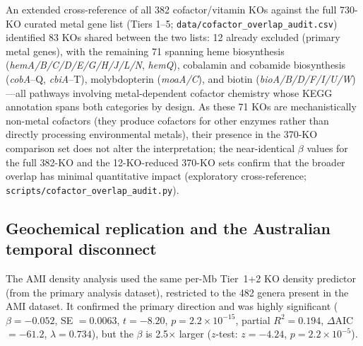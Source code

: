 \documentclass[times]{zHenriquesLab-StyleBioRxiv}
\begin{document}
An extended cross-reference of all 382 cofactor/vitamin KOs against the full
730-KO curated metal gene list (Tiers 1--5; \texttt{data/cofactor\_overlap\_audit.csv})
identified 83 KOs shared between the two lists: 12 already excluded (primary
metal genes), with the remaining 71 spanning heme biosynthesis
(\textit{hemA/B/C/D/E/G/H/J/L/N}, \textit{hemQ}), cobalamin and cobamide
biosynthesis (\textit{cobA}--Q, \textit{cbiA}--T), molybdopterin
(\textit{moaA/C}), and biotin (\textit{bioA/B/D/F/I/U/W})---all pathways
involving metal-dependent cofactor chemistry whose KEGG annotation spans both
categories by design. As these 71 KOs are mechanistically non-metal cofactors
(they produce cofactors for other enzymes rather than directly processing
environmental metals), their presence in the 370-KO comparison set does not
alter the interpretation; the near-identical $\beta$ values for the full
382-KO and the 12-KO-reduced 370-KO sets confirm that the broader overlap has
minimal quantitative impact (exploratory cross-reference;
\texttt{scripts/cofactor\_overlap\_audit.py}).


\subsection{Geochemical replication and the Australian temporal disconnect}
\label{ss:georeplication}

The AMI density analysis used the same per-Mb Tier~1+2 KO
density predictor (from the primary analysis dataset),
restricted to the 482 genera present in the AMI dataset. It
confirmed the primary direction and was highly significant ($\beta = -0.052$,
SE $= 0.0063$, $t = -8.20$, $p = 2.2 \times 10^{-15}$, partial $R^2 = 0.194$,
$\Delta$AIC $= -61.2$, $\lambda = 0.734$), but the $\beta$ is 2.5$\times$
larger ($z$-test: $z = -4.24$, $p = 2.2 \times 10^{-5}$).
\end{document}
